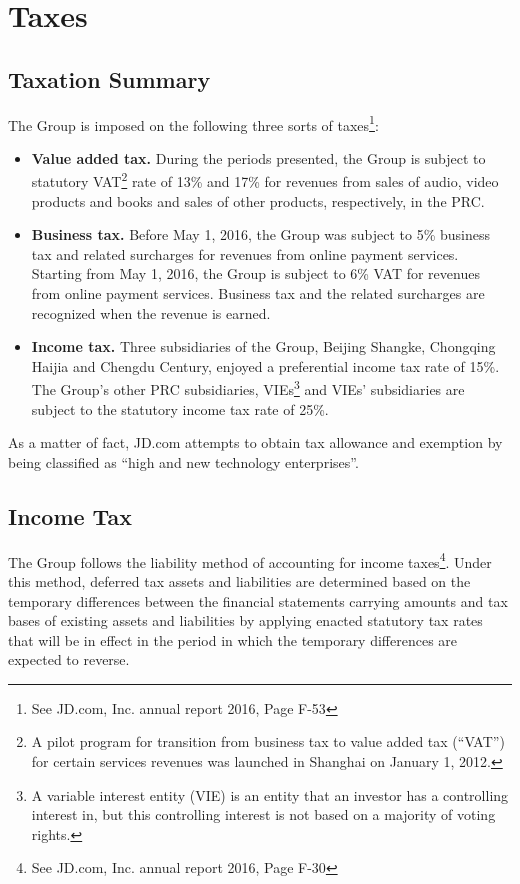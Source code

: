 \section{Taxes}
\subsection{Taxation Summary}

The Group is imposed on the following three sorts of taxes\footnote{See JD.com, Inc. annual report 2016, Page F-53}:
\begin{itemize}
	\item \textbf{Value added tax.}
    During the periods presented, the Group is subject to statutory VAT\footnote{A pilot program for transition from business tax to value added tax (“VAT”) for certain services revenues was launched in Shanghai on January 1, 2012.} rate of 13\% and 17\% for revenues from sales of audio, video products and books and sales of other products, respectively, in the PRC. 
	\item \textbf{Business tax.}
	Before May 1, 2016, the Group was subject to 5\% business tax and related surcharges for revenues from online payment services. Starting from May 1, 2016, the Group is subject to 6\% VAT for revenues from online payment	services. Business tax and the related surcharges are recognized when the revenue is earned.
	\item \textbf{Income tax.}
	Three subsidiaries of the Group, Beijing Shangke, Chongqing Haijia and Chengdu Century, enjoyed a preferential
	income tax rate of 15\%. The Group’s other PRC subsidiaries, VIEs\footnote{A variable interest entity (VIE) is an entity that an investor has a controlling interest in, but this controlling interest is not based on a majority of voting rights.} and VIEs’ subsidiaries are subject to the statutory income tax rate of 25\%. 
\end{itemize}
As a  matter of fact, JD.com attempts to obtain tax allowance and exemption by being classified as “high and new technology enterprises”. 
\subsection{Income Tax}

The Group follows the liability method of accounting for income taxes\footnote{See JD.com, Inc. annual report 2016, Page F-30}. Under this method, deferred tax assets and liabilities are determined based on the temporary differences between the financial statements carrying amounts and tax bases of existing assets and liabilities by applying enacted statutory tax rates that will be in effect in the period in which the temporary differences are expected to reverse. 

